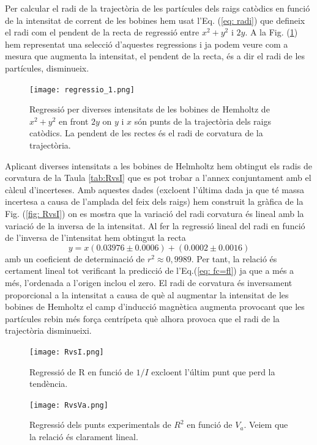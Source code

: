 \documentclass[11pt]{article}
\numberwithin{equation}{section}
\numberwithin{figure}{section}
\numberwithin{table}{section}
\begin{document}
Per calcular el radi de la trajectòria de les partícules dels raigs catòdics en funció de la intensitat de corrent de les bobines hem usat l'Eq. (\ref{eq: radi}) que defineix el radi com el pendent de la recta de regressió entre $x^2+y^2$ i $2y$. A la Fig. (\ref{fig: regressio_1}) hem representat una selecció d'aquestes regressions i ja podem veure com a mesura que augmenta la intensitat, el pendent de la recta, és a dir el radi de les partícules, disminueix. 
\begin{figure}[H]
    \centering
    \texttt{[image: regressio\_1.png]}
    \caption{Regressió per diverses intensitats de les bobines de Hemholtz de $x^2+y^2$ en front $2y$ on $y$ i $x$ són punts de la trajectòria dels raigs catòdics. La pendent de les rectes és el radi de corvatura de la trajectòria.}
    \label{fig: regressio_1}
\end{figure}
Aplicant diverses intensitats a les bobines de Helmholtz hem obtingut els radis de corvatura de la Taula \ref{tab:RvsI} que es pot trobar a l'annex conjuntament amb el càlcul d'incerteses. Amb aquestes dades (excloent l'última dada ja que té massa incertesa a causa de l'amplada del feix dels raigs) hem construit la gràfica de la Fig. (\ref{fig: RvsI}) on es mostra que la variació del radi corvatura és lineal amb la variació de la inversa de la intensitat. 
Al fer la regressió lineal del radi en funció de l'inversa de l'intensitat hem obtingut la recta
\begin{equation}
    y=x(0.03976\pm0.0006)+(0.0002\pm0.0016)
\end{equation}  
amb un coeficient de determinació de $r^2\approx0,9989$. Per tant, la relació és certament lineal tot verificant la predicció de l'Eq.(\ref{eq: fc=fl}) ja que a més a més, l'ordenada a l'origen inclou el zero. El radi de corvatura és inversament proporcional a la intensitat a causa de què al augmentar la intensitat de les bobines de Hemholtz el camp d'inducció magnètica augmenta provocant que les partícules rebin més força centrípeta què alhora provoca que el radi de la trajectòria disminueixi.
\begin{figure}[h]
    \centering
    \begin{minipage}{0.45\textwidth}
        \centering
        \texttt{[image: RvsI.png]}
        \caption{Regressió de R en funció de $1/I$ excloent l'últim punt que perd la tendència.}
        \label{fig: RvsI}
    \end{minipage}
    \hfill
    \begin{minipage}{0.45\textwidth} 
        \centering
        \texttt{[image: RvsVa.png]}
        \caption{Regressió dels punts experimentals de $R^2$ en funció de $V_a$. Veiem que la relació és clarament lineal.}
        \label{fig: RvsVa}
    \end{minipage}
\end{figure}
\end{document}
